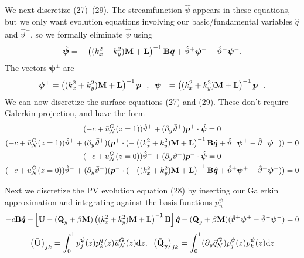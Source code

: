 \documentclass[10pt]{article}
\newcommand{\pd}[1]{\partial_{#1}}
\newcommand{\sN}{\mathcal{N}}
\newcommand{\mat}[1]{\text{\bf #1}}
\begin{document}
We next discretize (27)--(29).
The streamfunction $\hat{\psi}$ appears in these equations, but we only want evolution equations involving our basic/fundamental variables $\hat{q}$ and $\hat{\vartheta}^\pm$, so we formally eliminate $\hat{\psi}$ using
\[\hat{\bm{\psi}} = -\left((k_x^2+k_y^2)\mat{M}+\mat{L}\right)^{-1}\mat{B}\hat{\bm{q}} +\hat{\vartheta}^+\bm{\psi}^+-\hat{\vartheta}^-\bm{\psi}^-.\]
The vectors $\bm{\psi}^\pm$ are
\[\bm{\psi}^+ = \left((k_x^2+k_y^2)\mat{M}+\mat{L}\right)^{-1}\bm{p}^+,\;\;\bm{\psi}^- = \left((k_x^2+k_y^2)\mat{M}+\mat{L}\right)^{-1}\bm{p}^-.\]
We can now discretize the surface equations (27) and (29).
These don't require Galerkin projection, and have the form
\begin{gather}\notag
(-c+\bar u_\sN^G(z=1))\hat{\vartheta}^+ + (\pd{y}\bar\vartheta^+)\bm{p}^+\cdot\hat{\bm{\psi}}=0\\
(-c+\bar u_\sN^G(z=1))\hat{\vartheta}^+ + (\pd{y}\bar\vartheta^+)(\bm{p}^+\cdot(-\left((k_x^2+k_y^2)\mat{M}+\mat{L}\right)^{-1}\mat{B}\hat{\bm{q}} +\hat{\vartheta}^+\bm{\psi}^+-\hat{\vartheta}^-\bm{\psi}^-))=0\\\notag
(-c+\bar u_\sN^G(z=0))\hat{\vartheta}^- + (\pd{y}\bar\vartheta^-)\bm{p}^-\cdot\hat{\bm{\psi}}=0\\
(-c+\bar u_\sN^G(z=0))\hat{\vartheta}^- + (\pd{y}\bar\vartheta^-)(\bm{p}^-\cdot(-\left((k_x^2+k_y^2)\mat{M}+\mat{L}\right)^{-1}\mat{B}\hat{\bm{q}} +\hat{\vartheta}^+\bm{\psi}^+-\hat{\vartheta}^-\bm{\psi}^-))=0
\end{gather}

Next we discretize the PV evolution equation (28) by inserting our Galerkin approximation and integrating against the basis functions $p_n^\psi$
\begin{gather}
-c\mat{B}\hat{\bm{q}} +\left[\bar{\mat{U}} -(\bar{\mat{Q}}_y+\beta\mat{M})\left((k_x^2+k_y^2)\mat{M}+\mat{L}\right)^{-1} \mat{B}\right]\hat{\bm{q}} + (\bar{\mat{Q}}_y+\beta\mat{M})(\hat{\vartheta}^+\bm{\psi}^+-\hat{\vartheta}^-\bm{\psi}^-) = 0
\end{gather}
\[\left(\bar{\mat{U}}\right)_{jk} = \int_0^1 p_j^\psi(z)p_k^q(z)\bar{u}_\sN^G(z)\text{d}z,\;\;\left(\bar{\mat{Q}}_y\right)_{jk} = \int_0^1(\pd{y}\bar q_\sN^G)p_j^\psi(z)p_k^\psi(z)\text{d}z\]
\end{document}
